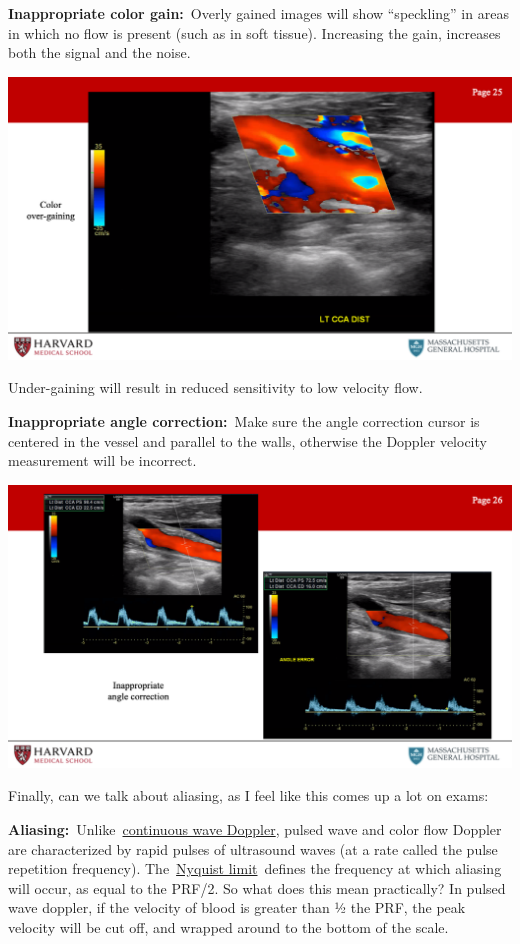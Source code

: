 \documentclass[
]{book}
\begin{document}
\textbf{Inappropriate color gain:}~Overly gained images will show ``speckling''
in areas in which no flow is present (such as in soft tissue).
Increasing the gain, increases both the signal and the
noise.\citep{kremkau2021}

\includegraphics[width=15.01in]{images/vasc_lab2/Slide26}

Under-gaining will result in reduced sensitivity to low velocity flow.

\textbf{Inappropriate angle correction:}~Make sure the angle correction
cursor is centered in the vessel and parallel to the walls, otherwise
the Doppler velocity measurement will be incorrect.

\includegraphics[width=15.01in]{images/vasc_lab2/Slide27}

Finally, can we talk about aliasing, as I feel like this comes up a lot
on exams:

\textbf{Aliasing:}~Unlike~\href{https://radiopaedia.org/articles/continuous-wave-doppler?lang=us}{continuous wave
Doppler},
pulsed wave and color flow Doppler are characterized by rapid pulses of
ultrasound waves (at a rate called the pulse repetition frequency).
The~\href{https://radiopaedia.org/articles/nyquist-limit?lang=us}{Nyquist
limit}~defines
the frequency at which aliasing will occur, as equal to the PRF/2. So
what does this mean practically? In pulsed wave doppler, if the velocity
of blood is greater than ½ the PRF, the peak velocity will be cut off,
and wrapped around to the bottom of the scale.
\end{document}
